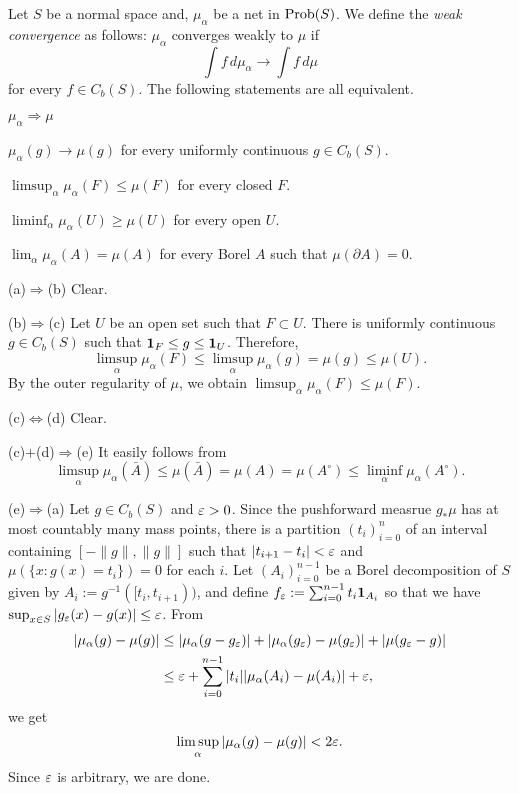 \documentclass{../../large}
\begin{document}




\begin{prb}
Let $S$ be a normal space and, $\mu_\alpha$ be a net in $\operatorname{Prob}(S)$.
We define the \emph{weak convergence} as follows: $\mu_\alpha$ converges weakly to $\mu$ if
\[\int f\,d\mu_\alpha\to\int f\,d\mu\]
for every $f\in C_b(S)$.
The following statements are all equivalent.
\begin{parts}
\item $\mu_\alpha\Rightarrow\mu$
\item $\mu_\alpha(g)\to\mu(g)$ for every uniformly continuous $g\in C_b(S)$.
\item $\limsup_\alpha\mu_\alpha(F)\le\mu(F)$ for every closed $F$.
\item $\liminf_\alpha\mu_\alpha(U)\ge\mu(U)$ for every open $U$.
\item $\lim_\alpha\mu_\alpha(A)=\mu(A)$ for every Borel $A$ such that $\mu(\partial A)=0$.
\end{parts}
\end{prb}
\begin{pf}
(a)$\Rightarrow$(b)
Clear.

(b)$\Rightarrow$(c)
Let $U$ be an open set such that $F\subset U$.
There is uniformly continuous $g\in C_b(S)$ such that $\mathbf{1}_F\le g\le\mathbf{1}_U$.
Therefore,
\[\limsup_\alpha\mu_\alpha(F)\le\limsup_\alpha\mu_\alpha(g)=\mu(g)\le\mu(U).\]
By the outer regularity of $\mu$, we obtain $\limsup_\alpha\mu_\alpha(F)\le\mu(F)$.

(c)$\Leftrightarrow$(d)
Clear.

(c)$+$(d)$\Rightarrow$(e)
It easily follows from
\[\limsup_\alpha\mu_\alpha(\bar A)\le\mu(\bar A)=\mu(A)=\mu(A^\circ)\le\liminf_\alpha\mu_\alpha(A^\circ).\]

(e)$\Rightarrow$(a)
Let $g\in C_b(S)$ and $\varepsilon>0$.
Since the pushforward measrue $g_*\mu$ has at most countably many mass points, there is a partition $(t_i)_{i=0}^n$ of an interval containing $[-\|g\|,\|g\|]$ such that $|t_{i+1}-t_i|<\varepsilon$ and $\mu(\{x:g(x)=t_i\})=0$ for each $i$.
Let $(A_i)_{i=0}^{n-1}$ be a Borel decomposition of $S$ given by $A_i:=g^{-1}([t_i,t_{i+1}))$, and define $f_\varepsilon:=\sum_{i=0}^{n-1}t_i\mathbf{1}_{A_i}$ so that we have $\sup_{x\in S}|g_\varepsilon(x)-g(x)|\le\varepsilon$.
From
\begin{align*}
|\mu_\alpha(g)-\mu(g)|&\le|\mu_\alpha(g-g_\varepsilon)|+|\mu_\alpha(g_\varepsilon)-\mu(g_\varepsilon)|+|\mu(g_\varepsilon-g)|\\
&\le\varepsilon+\sum_{i=0}^{n-1}|t_i||\mu_\alpha(A_i)-\mu(A_i)|+\varepsilon,
\end{align*}
we get
\[\limsup_\alpha|\mu_\alpha(g)-\mu(g)|<2\varepsilon.\]
Since $\varepsilon$ is arbitrary, we are done.
\end{pf}
\end{document}
